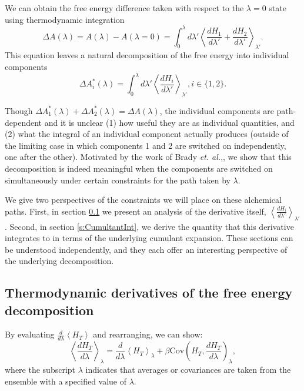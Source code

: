 \documentclass[%
 preprint,
 amsmath,amssymb,
 aps,
]{revtex4-1}
\begin{document}
We can obtain the free energy difference taken with respect to the $\lambda=0$ state using thermodynamic integration\cite{NULL}
\begin{equation}
\Delta A (\lambda)= A(\lambda)-A(\lambda=0)  = \int_0^{\lambda} d \lambda'
\left\langle \frac{dH_1}{d \lambda'} +  \frac{dH_2}{d \lambda'}  \right \rangle_{\lambda'}.
\label{e:TI}
\end{equation}
This equation leaves a natural decomposition of the free energy into individual components
\begin{equation}
\Delta A^*_i  (\lambda) = \int_0^{\lambda} d \lambda' 
\left\langle \frac{dH_i}{d \lambda'} \right \rangle_{\lambda'}, i \in \{ 1,2 \}.
\label{e:TIcomps}
\end{equation}
 
Though $\Delta A^*_1  (\lambda)+ \Delta A^*_2  (\lambda)= \Delta A (\lambda)$, the individual components are path-dependent and it is unclear (1) how useful they are as individual quantities, and (2) what the integral of an individual component actually produces (outside of the limiting case in which components 1 and 2 are switched on independently, one after the other).  Motivated by the work of Brady \emph{et. al.},\cite{NULL}, we show that this decomposition is indeed meaningful when the components are switched on simultaneously under certain constraints for the path taken by $\lambda$.

We give two perspectives of the constraints we will place on these alchemical paths.  First, in section \ref{s:CumulantDerv} we present an analysis of the derivative itself, 
$\left\langle \frac{dH_i}{d \lambda'} \right \rangle_{\lambda'}$.  Second, in section \ref{s:CumultantInt}, we derive the quantity that this derivative integrates to in terms of the underlying cumulant expansion.  These sections can be understood independently, and they each offer an interesting perspective of the underlying decomposition. 


\subsection{Thermodynamic derivatives of the free energy decomposition}
\label{s:CumulantDerv}

By evaluating $\frac{d}{d\lambda}\left<H_T\right>$ and rearranging, we can show:
\begin{equation}
\left<\frac{dH_T}{d\lambda}\right>_\lambda = 
\frac{d}{d\lambda}\left<H_T\right>_\lambda +
\beta \mathrm{Cov}\left(H_T, \frac{dH_T}{d\lambda} \right)_\lambda,
\end{equation}
where the subscript $\lambda$ indicates that averages or covariances are taken from the ensemble with a specified value of $\lambda$.
\end{document}
